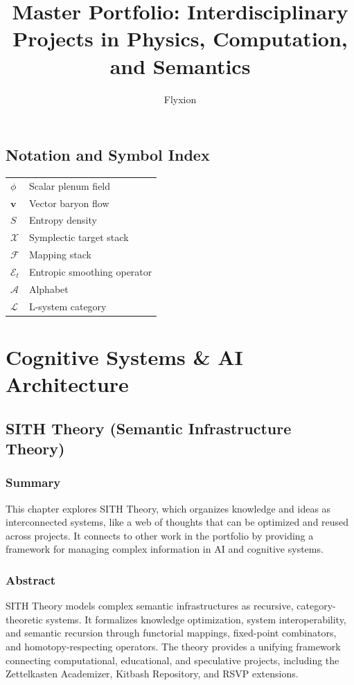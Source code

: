 \documentclass[11pt,oneside]{memoir}
\theoremstyle{plain}
\newcommand{\F}{\mathcal{F}}
\newcommand{\X}{\mathcal{X}}
\newcommand{\E}{\mathcal{E}}
\newcommand{\A}{\mathcal{A}}
\newcommand{\Lcal}{\mathcal{L}} %
\begin{document}
\frontmatter
\title{Master Portfolio: Interdisciplinary Projects in Physics, Computation, and Semantics}
\author{Flyxion}
\maketitle
\tableofcontents
\listoffigures

\chapter*{Notation and Symbol Index}
\begin{tabular}{ll}
$\phi$ & Scalar plenum field \\
$\mathbf{v}$ & Vector baryon flow \\
$S$ & Entropy density \\
$\X$ & Symplectic target stack \\
$\F$ & Mapping stack \\
$\E_t$ & Entropic smoothing operator \\
$\A$ & Alphabet \\
$\Lcal$ & L-system category \\
\end{tabular}

\mainmatter

\part{Cognitive Systems \& AI Architecture}

\chapter{SITH Theory (Semantic Infrastructure Theory)}
\label{sec:sith}

\section{Summary}
This chapter explores SITH Theory, which organizes knowledge and ideas as interconnected systems, like a web of thoughts that can be optimized and reused across projects. It connects to other work in the portfolio by providing a framework for managing complex information in AI and cognitive systems.

\section{Abstract}
SITH Theory models complex semantic infrastructures as recursive, category-theoretic systems. It formalizes knowledge optimization, system interoperability, and semantic recursion through functorial mappings, fixed-point combinators, and homotopy-respecting operators. The theory provides a unifying framework connecting computational, educational, and speculative projects, including the Zettelkasten Academizer, Kitbash Repository, and RSVP extensions.
\end{document}
